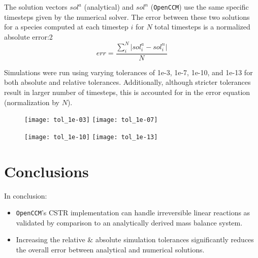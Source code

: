 \documentclass[a4paper,12pt]{article}
\begin{document}
The solution vectors $sol^a$ (analytical) and $sol^n$ (\texttt{OpenCCM}) use the same specific timesteps given by the numerical solver.
The error between these two solutions for a species computed at each timestep $i$ for $N$ total timesteps is a normalized absolute error:2
\begin{equation}
	err = \frac{\sum_i^N \lvert sol^a_i - sol^n_i \rvert}{N}
\end{equation}

\newpage
Simulations were run using varying tolerances of 1e-3, 1e-7, 1e-10, and 1e-13 for both absolute and relative tolerances.
Additionally, although stricter tolerances result in larger number of timesteps, this is accounted for in the error equation (normalization by $N$).

\begin{figure}[H]
    \texttt{[image: tol\_1e-03]}\hfill
    \texttt{[image: tol\_1e-07]}
\end{figure}
\begin{figure}[H]
    \texttt{[image: tol\_1e-10]}\hfill
    \texttt{[image: tol\_1e-13]}
\end{figure}

\section{Conclusions}

In conclusion:
\begin{itemize}
	\item \texttt{OpenCCM}'s CSTR implementation can handle irreversible linear reactions as validated by comparison to an analytically derived mass balance system.
	\item Increasing the relative \& absolute simulation tolerances significantly reduces the overall error between analytical and numerical solutions.
\end{itemize}
\end{document}
